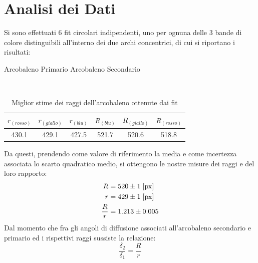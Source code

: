 \documentclass{report}[a4paper,11pt]
\begin{document}
\section{Analisi dei Dati}
Si sono effettuati $6$ fit circolari indipendenti, uno per ognuna delle $3$ bande di colore distinguibili all'interno dei due archi concentrici, di cui si riportano i risultati:\\
\begin{table}[!htb]
  \begin{center}
  \begin{large}
  Arcobaleno Primario \qquad  Arcobaleno Secondario
  \end{large}\\
	\begin{tabular}{ccc|ccc}
	\toprule
	$r_{(rosso)}$  & $r_{(giallo)}$  & $r_{(blu)}$ & $R_{(blu)}$  & $R_{(giallo)}$  & $R_{(rosso)}$ \\
	\midrule
	\midrule
	 430.1 & 429.1 & 427.5 & 521.7 & 520.6 & 518.8 \\ 
	\bottomrule
	\end{tabular}
  \end{center}
  \caption{Miglior stime dei raggi dell'arcobaleno ottenute dai fit\label{tab:arcfit}}
\end{table}
Da questi, prendendo come valore di riferimento la media e come incertezza associata lo scarto quadratico medio, si ottengono le nostre misure dei raggi e del loro rapporto:
\begin{align}\label{aln: bowrad}
R &= 520 \pm 1 \; [\rm px] \\
r &= 429 \pm 1 \; [\rm px] \\
\frac{R}{r} &= 1.213 \pm 0.005
\end{align}
Dal momento che fra gli angoli di diffusione associati all’arcobaleno secondario e primario ed i rispettivi raggi sussiste la relazione:
\begin{equation}\label{eq:ratio}
\frac{\delta_2}{\delta_1} = \frac{R}{r}
\end{equation}
\end{document}
